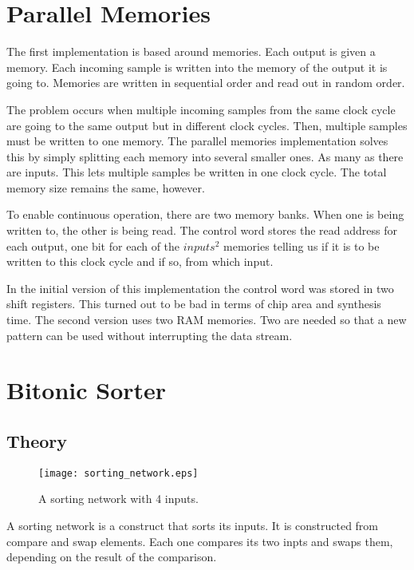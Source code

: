 \documentclass[
	utf8,
	largesmallcaps,
	intlimits,
	widermath,
	sharecounter,
	nobreak,
	definition=marks,
	numbers,
	noparts
]{rtthesis}
\begin{document}
\chapter{Parallel Memories}

The first implementation is based around memories. Each output is given a
memory. Each incoming sample is written into the memory of the output it is
going to. Memories are written in sequential order and read out in random
order.

The problem occurs when multiple incoming samples from the same clock cycle are
going to the same output but in different clock cycles. Then, multiple samples
must be written to one memory. The parallel memories implementation solves this
by simply splitting each memory into several smaller ones. As many as there are
inputs. This lets multiple samples be written in one clock cycle. The total
memory size remains the same, however.

To enable continuous operation, there are two memory banks. When one is being
written to, the other is being read. The control word stores the read address
for each output, one bit for each of the $inputs^2$ memories telling us if it
is to be written to this clock cycle and if so, from which input.

In the initial version of this implementation the control word was stored in
two shift registers. This turned out to be bad in terms of chip area and
synthesis time. The second version uses two RAM memories. Two are needed so
that a new pattern can be used without interrupting the data stream.

\chapter{Bitonic Sorter}

\section{Theory}

\begin{wrapfigure}{R}{.4\textwidth}
\begin{center}
\texttt{[image: sorting\_network.eps]}
\end{center}
\caption{
A sorting network with 4 inputs.
}
\label{fig:sortnetwork}
\end{wrapfigure}

A sorting network is a construct that sorts its inputs. It is constructed from
compare and swap elements. Each one compares its two inpts and swaps them,
depending on the result of the comparison.
\end{document}
